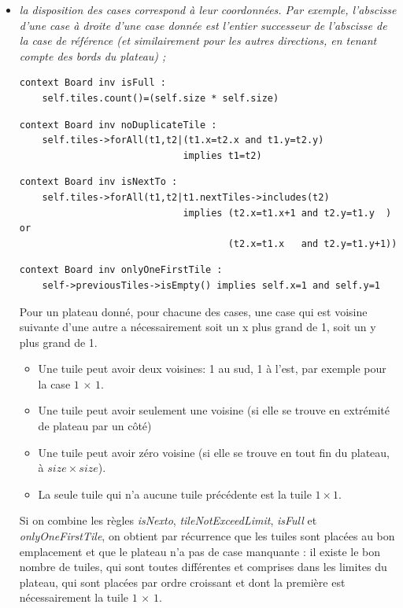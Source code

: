 \documentclass[oneside,a4paper]{book}
\begin{document}
\begin{itemize}
    \item \textit{la disposition des cases correspond à leur coordonnées. Par exemple, l'abscisse d'une case à droite d'une case donnée est l'entier successeur de l'abscisse de la case de référence (et similairement pour les autres directions, en tenant compte des bords du plateau) ;}
        \begin{lstlisting}
context Board inv isFull : 
    self.tiles.count()=(self.size * self.size)
        \end{lstlisting}
        \begin{lstlisting}
context Board inv noDuplicateTile : 
    self.tiles->forAll(t1,t2|(t1.x=t2.x and t1.y=t2.y)
                             implies t1=t2)
        \end{lstlisting}
\begin{minipage}{\linewidth}
        \begin{lstlisting}
context Board inv isNextTo : 
    self.tiles->forAll(t1,t2|t1.nextTiles->includes(t2) 
                             implies (t2.x=t1.x+1 and t2.y=t1.y  ) or
                                     (t2.x=t1.x   and t2.y=t1.y+1))
        \end{lstlisting}
\end{minipage}
        \begin{lstlisting}
context Board inv onlyOneFirstTile : 
    self->previousTiles->isEmpty() implies self.x=1 and self.y=1
        \end{lstlisting}
    Pour un plateau donné, pour chacune des cases, une case qui est voisine suivante d'une autre a nécessairement soit un x plus grand de 1, soit un y plus grand de 1.
    \begin{itemize}
        \item Une tuile peut avoir deux voisines: 1 au sud, 1 à l'est, par exemple pour la case $1\,\times\,1$.
        \item Une tuile peut avoir seulement une voisine (si elle se trouve en extrémité de plateau par un côté)
        \item Une tuile peut avoir zéro voisine (si elle se trouve en tout fin du plateau, à $size \times size$).
        \item La seule tuile qui n'a aucune tuile précédente est la tuile $1\times 1$.
    \end{itemize}

    \begin{tcolorbox}
        Si on combine les règles \textit{isNexto}, \textit{tileNotExceedLimit}, \textit{isFull} et \textit{onlyOneFirstTile}, on obtient par récurrence que les tuiles sont placées au bon emplacement et que le plateau n'a pas de case manquante : il existe le bon nombre de tuiles, qui sont toutes différentes et comprises dans les limites du plateau, qui sont placées par ordre croissant et dont la première est nécessairement la tuile $1\,\times\,1$.   
    \end{tcolorbox}
    

\end{itemize}
\end{document}
